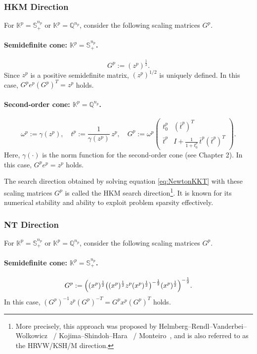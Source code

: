 \subsubsection{HKM Direction}
For $\mathbb{K}^p = \mathbb{S}^{n_p}_+$ or $\mathbb{K}^p = \mathbb{Q}^{n_p}$, consider the following scaling matrices $G^p$.

\paragraph{Semidefinite cone: \(\mathbb{K}^p = \mathbb{S}^{n_p}_+\).}
\[
  G^p := (z^p)^{\tfrac12}.
\]
Since $z^p$ is a positive semidefinite matrix, $(z^p)^{1/2}$ is uniquely defined. 
In this case, $G^p e^p (G^p)^T = z^p$ holds.

\paragraph{Second-order cone: \(\mathbb{K}^p = \mathbb{Q}^{n_p}\).}
\[
  \omega^p := \gamma(z^p), 
  \quad
  t^p := \frac{1}{\gamma(z^p)}\, z^p,
  \quad
  G^p :=
  \omega^p
  \begin{pmatrix}
    t^p_0 & (\bar{t}^p)^T \\
    \bar{t}^p & I + \frac{1}{1+t^p_0}\,\bar{t}^p(\bar{t}^p)^T
  \end{pmatrix}.
\]
Here, $\gamma(\cdot)$ is the norm function for the second-order cone (see Chapter 2). 
In this case, $G^p e^p = z^p$ holds.

The search direction obtained by solving equation \eqref{eq:NewtonKKT} with these scaling matrices $G^p$ is called the HKM search direction\footnote{
More precisely, this approach was proposed by Helmberg--Rendl--Vanderbei--Wolkowicz~\cite{} / Kojima--Shindoh--Hara~\cite{Kojima1997} / Monteiro~\cite{Monteiro1997}, and is also referred to as the HRVW/KSH/M direction.
}. 
It is known for its numerical stability and ability to exploit problem sparsity effectively.


\subsubsection{NT Direction}
For $\mathbb{K}^p = \mathbb{S}^{n_p}_+$ or $\mathbb{K}^p = \mathbb{Q}^{n_p}$, consider the following scaling matrices $G^p$.

\paragraph{Semidefinite cone: \(\mathbb{K}^p = \mathbb{S}^{n_p}_+\).}
\[
  G^p 
  := 
    \Bigl( (x^p)^{\frac12} \bigl( (x^p)^{\frac12} z^p (x^p)^{\frac12} \bigr)^{-\frac12} (x^p)^{\frac12} \Bigr)^{-\frac12}.
\]
In this case, $(G^p)^{-1} z^p (G^p)^{-T} = G^p x^p (G^p)^T$ holds. 

